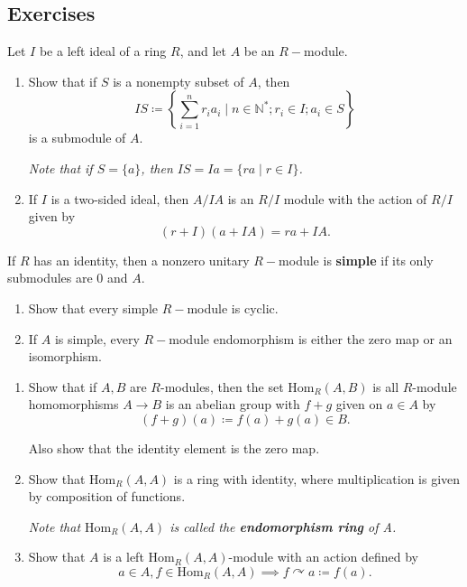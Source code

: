 \subsection{Exercises}

\begin{problem}[Hungerford 4.1.3]
\label{prob:1.1}
Let $I$ be a left ideal of a ring $R$, and let $A$ be an $R-$module.

\begin{enumerate}
    \item Show that if $S$ is a nonempty subset of $A$, then
    \[
    IS \coloneqq \left\{ \sum_{i=1}^n r_i a_i \mid n\in \mathbb{N}^*; r_i \in I; a_i \in S \right\}
    \]
    is a submodule of $A$. 
    
    \textit{Note that if $S = \{a\}$, then $IS = Ia = \{ra \mid r\in I\}$.}
    
    \item If $I$ is a two-sided ideal, then $A/IA$ is an $R/I$ module with the action of $R/I$ given by
    \[
    (r+I)(a+IA) = ra + IA.
    \]
\end{enumerate}
\end{problem}

\begin{problem}[Hungerford 4.1.5]
\label{prob:1.1}
If $R$ has an identity, then a nonzero unitary $R-$module is \textbf{simple} if its only submodules are $0$ and $A$.
\begin{enumerate}
    \item Show that every simple $R-$module is cyclic.
    \item If $A$ is simple, every $R-$module endomorphism is either the zero map or an isomorphism.
\end{enumerate}
\end{problem}

\begin{problem}[Hungerford 4.1.7]
\label{prob:1.1}
\begin{enumerate}
    \item Show that if $A,B$ are $R$-modules, then the set $\mathrm{Hom}_R(A, B)$ is all $R$-module homomorphisms $A \to B$ is an abelian group with $f+g$ given on $a\in A$ by
    \[
    (f+g)(a) \coloneqq f(a) + g(a) \in B.
    \]
    
    Also show that the identity element is the zero map.
    
    \item Show that $\mathrm{Hom}_R(A, A)$ is a ring with identity, where multiplication is given by composition of functions.
    
    \textit{Note that $\mathrm{Hom}_R(A, A)$ is called the \textbf{endomorphism ring} of A.}
    
    \item Show that $A$ is a left $\mathrm{Hom}_R(A, A)$-module with an action defined by 
    \[
    a\in A, f\in \mathrm{Hom}_R(A, A) \implies f \curvearrowright a \coloneqq f(a).
    \]
\end{enumerate}
\end{problem}

